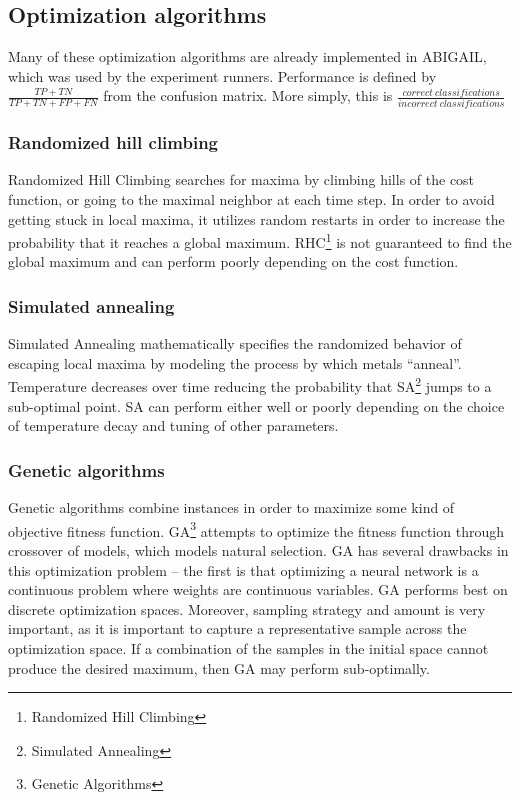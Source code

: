 \documentclass[12pt]{article}
\begin{document}
\subsection{Optimization algorithms}
Many of these optimization algorithms are already implemented in ABIGAIL, which was used by the experiment runners. Performance is defined by $\frac{TP+TN}{TP+TN+FP+FN}$ from the confusion matrix. More simply, this is $\frac{correct\ classifications}{incorrect\ classifications}$

\subsubsection{Randomized hill climbing}
Randomized Hill Climbing searches for maxima by climbing hills of the cost function, or going to the maximal neighbor at each time step. In order to avoid getting stuck in local maxima, it utilizes random restarts in order to increase the probability that it reaches a global maximum. RHC\footnote{Randomized Hill Climbing} is not guaranteed to find the global maximum and can perform poorly depending on the cost function.


\subsubsection{Simulated annealing}
Simulated Annealing mathematically specifies the randomized behavior of escaping local maxima by modeling the process by which metals “anneal”. Temperature decreases over time reducing the probability that SA\footnote{Simulated Annealing} jumps to a sub-optimal point. SA can perform either well or poorly depending on the choice of temperature decay and tuning of other parameters.


\subsubsection{Genetic algorithms}
Genetic algorithms combine instances in order to maximize some kind of objective fitness function. GA\footnote{Genetic Algorithms} attempts to optimize the fitness function through crossover of models, which models natural selection. GA has several drawbacks in this optimization problem – the first is that optimizing a neural network is a continuous problem where weights are continuous variables. GA performs best on discrete optimization spaces. Moreover, sampling strategy and amount is very important, as it is important to capture a representative sample across the optimization space.  If a combination of the samples in the initial space cannot produce the desired maximum, then GA may perform sub-optimally.
\end{document}
